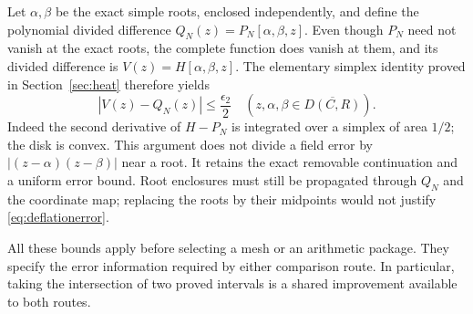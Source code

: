 Let $\alpha,\beta$ be the exact simple roots, enclosed independently,
and define the polynomial divided difference
$Q_N(z)=P_N[\alpha,\beta,z]$. Even though $P_N$ need not vanish at the
exact roots, the complete function does vanish at them, and its divided
difference is $V(z)=H[\alpha,\beta,z]$. The elementary simplex identity proved in
Section~\ref{sec:heat} therefore yields
\begin{equation}\label{eq:deflationerror}
 |V(z)-Q_N(z)|\le\frac{\epsilon_2}{2}
 \quad(z,\alpha,\beta\in\overline{D(C,R)}).
\end{equation}
Indeed the second derivative of $H-P_N$ is integrated over a simplex of
area $1/2$; the disk is convex. This argument does not divide a field
error by $|(z-\alpha)(z-\beta)|$ near a root. It retains the exact
removable continuation and a uniform error bound. Root enclosures must
still be propagated through $Q_N$ and the coordinate map; replacing the
roots by their midpoints would not justify \eqref{eq:deflationerror}.

All these bounds apply before selecting a mesh or an arithmetic package.
They specify the error information required by either comparison route.
In particular, taking the intersection of two proved intervals is a
shared improvement available to both routes.
